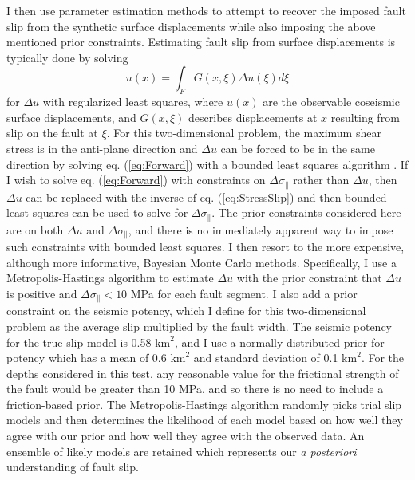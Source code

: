 \documentclass[12pt]{article}
\begin{document}
I then use parameter estimation methods to attempt to recover the imposed fault slip from the synthetic surface displacements while also imposing the above mentioned prior constraints. Estimating fault slip from surface displacements is typically done by solving 
\begin{equation}\label{eq:Forward}
  u(x) = \int_F G(x,\xi) \Delta u(\xi) d\xi
\end{equation}
for $\Delta u$ with regularized least squares, where $u(x)$ are the observable coseismic surface displacements, and $G(x,\xi)$ describes displacements at $x$ resulting from slip on the fault at $\xi$.  For this two-dimensional problem, the maximum shear stress is in the anti-plane direction and $\Delta u$ can be forced to be in the same direction by solving eq. (\ref{eq:Forward}) with a bounded least squares algorithm \citep{Lawson1995}.  If I wish to solve eq. (\ref{eq:Forward}) with constraints on $\Delta \sigma_\parallel$ rather than $\Delta u$, then $\Delta u$ can be replaced with the inverse of eq. (\ref{eq:StressSlip}) and then bounded least squares can be used to solve for $\Delta \sigma_\parallel$.  The prior constraints considered here are on both $\Delta u$ and $\Delta \sigma_\parallel$, and there is no immediately apparent way to impose such constraints with bounded least squares.  I then resort to the more expensive, although more informative, Bayesian Monte Carlo methods.  Specifically, I use a Metropolis-Hastings algorithm to estimate $\Delta u$ with the prior constraint that $\Delta u$ is positive and $\Delta \sigma_\parallel < 10$ MPa for each fault segment. I also add a prior constraint on the seismic potency, which I define for this two-dimensional problem as the average slip multiplied by the fault width.  The seismic potency for the true slip model is 0.58 $\mathrm{km}^2$, and I use a normally distributed prior for potency which has a mean of 0.6 $\mathrm{km}^2$ and standard deviation of 0.1 $\mathrm{km}^2$. For the depths considered in this test, any reasonable value for the frictional strength of the fault would be greater than 10 MPa, and so there is no need to include a friction-based prior.   The Metropolis-Hastings algorithm randomly picks trial slip models and then determines the likelihood of each model based on how well they agree with our prior and how well they agree with the observed data. An ensemble of likely models are retained which represents our \textit{a posteriori} understanding of fault slip.  
\end{document}
